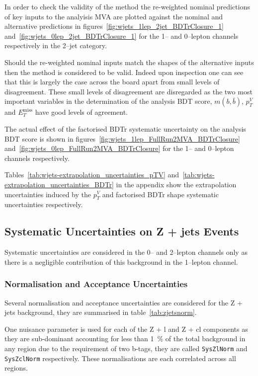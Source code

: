 In order to check the validity of the method the re-weighted nominal predictions
of key inputs to the analyisis MVA are plotted against the nominal and
alternative predictions in figures~\ref{fig:wjets_1lep_2jet_BDTrClosure_1}
and~\ref{fig:wjets_0lep_2jet_BDTrClosure_1} for the 1-- and 0--lepton channels
respectively in the 2--jet category.


Should the re-weighted nominal inputs match
the shapes of the alternative inputs then the method is considered to be valid.
Indeed upon inspection one can see that this is largely the case across the
board apart from small levels of disagreement. These small levels of
disagreement are disregarded as the two most important variables in the
determination of the analysis BDT score, $m(b, \bar{b})$, $p_T^V$ and
$E_T^{\text{miss}}$ have good levels of agreement.

The actual effect of the factorised BDTr systematic uncertainty on the analysis
BDT score is shown in figures~\ref{fig:wjets_1lep_FullRun2MVA_BDTrClosure}
and~\ref{fig:wjets_0lep_FullRun2MVA_BDTrClosure} for the 1-- and 0--lepton
channels respectively. 


Tables~\ref{tab:wjets-extrapolation_uncertainties_pTV}
and~\ref{tab:wjets-extrapolation_uncertainties_BDTr} in the appendix show the
extrapolation uncertainties induced by the $p_T^V$ and factorised BDTr shape
systematic uncertainties respectively.
\clearpage
\newpage

\subsection{Systematic Uncertainties on Z + jets Events}
\label{sec:zjets-systs}

Systematic uncertainties are considered in the 0-- and 2--lepton channels only
as there is a negligible contribution of this background in the 1--lepton channel.

\subsubsection{Normalisation and Acceptance Uncertainties}

Several normalisation and acceptance uncertainties are considered for the Z +
jets background, they are summarised in table~\ref{tab:zjetsnorm}.

One nuisance parameter is used for each of the Z + l and Z + cl components as
they are sub-dominant accounting for less than 1~\% of the total background in
any region due to the requirement of two b-tags, they are called
\texttt{SysZlNorm} and \texttt{SysZclNorm} respectively. These normalisations
are each correlated across all regions.


